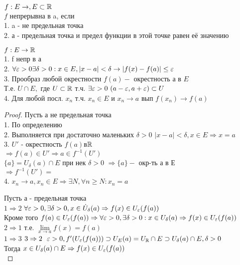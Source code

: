 \begin{definition}
	$ f : E \rightarrow, E \subset \mathbb{R}$\\
	$ f $ непрерывна в a, если \\
	1. a - не предельная точка \\
	2. а - предельная точка и предел функции в этой точке равен её значению 
	
	$ f : E \rightarrow \mathbb{R} $ \\
	1. f непр в а \\
	2. $ \forall \varepsilon > 0 \exists \delta > 0 : x\in E, | x - a | < \delta \rightarrow |f(x) - f(a) | \leq \varepsilon $\\
	3. Прообраз любой окрестности $ f(a) - $ окрестность а в $E$ \\
	Т.е. $ U \cap E, $ где $ U \subset \mathbb{R} $ т.ч. $ \exists \varepsilon > 0 \  (a-\varepsilon, a+\varepsilon) \subset U$\\
	4. Для любой посл. $ x_n $ т.ч. $ x_n \in E $ и $ x_n \rightarrow a $ вып $ f(x_n) \rightarrow f(a) $
	
	\begin{proof}
	Пусть а не предельная точка \\
	1. По определению \\
	2. Выполняется при достаточно маленьких $ \delta  > 0$ $ |x-a| < \delta, x \in E \Rightarrow x = a $ \\
	3. $U'$ - окрестность  $ f(a) $в$ \mathbb{R}$ \\
	$ \Rightarrow f(a) \in U' \Rightarrow a \in f^{-1}( U' ) $ \\
	$ \{a\} = U_{\delta} (a) \cap E $ при нек $ \delta > 0 $ $\Rightarrow \{a\} - $ окр-ть а в Е \\
	$ \Rightarrow  f^{-1}(U') = $\\
	4. $ x_n \rightarrow a, x_n \in E \Rightarrow \exists N, \forall n \geq N : x_n = a $ \\
	$ $%
	
	Пусть а - предельная точка \\
	 $ 1 \Rightarrow 2 $ 
	 $ \forall \varepsilon > 0, \exists \delta > 0, x\in \dot{U}_{\delta} (a) \Rightarrow f(x) \in U_{\varepsilon} (f(a)) $ \\
	 Кроме того $ f(a) \in U_{\varepsilon}(f(a)) \Rightarrow \forall \varepsilon > 0, \exists \delta > 0 : x \in U_{\delta} (a) \Rightarrow f(x) \in U_{\varepsilon} (f(a)) $
	 $ 2 \Rightarrow 1 $ т.е. $ \lim\limits_{x \rightarrow a} f(x) = f(a) $\\
	 $ 1 \Rightarrow 3 $ %
	 $ 3 \Rightarrow 2 \ \ \varepsilon > 0, f'(U_{\varepsilon} (f(a))) \supset U_E(a) =U_{\mathbb{R}}  \cap E \supset U_{\delta} (a) \cap E, \delta > 0 $ \\
	 Тогда $ x \in U_{\delta} (a) \cap E \Rightarrow f(x) \in U_{\varepsilon} (f(a)) $ \\
	 

\end{proof}
\end{definition}
